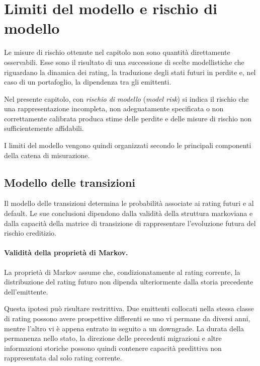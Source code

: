 \section{Limiti del modello e rischio di modello}

\label{sec:cap9-limiti-rischio-modello}

Le misure di rischio ottenute nel capitolo non sono quantit\`{a}
direttamente osservabili. Esse sono il risultato di una successione di
scelte modellistiche che riguardano la dinamica dei rating, la
traduzione degli stati futuri in perdite e, nel caso di un portafoglio,
la dipendenza tra gli emittenti.

Nel presente capitolo, con \emph{rischio di modello}
(\emph{model risk}) si indica il rischio che una rappresentazione
incompleta, non adeguatamente specificata o non correttamente calibrata
produca stime delle perdite e delle misure di rischio non sufficientemente
affidabili.

I limiti del modello vengono quindi organizzati secondo le principali
componenti della catena di misurazione.

\subsection{Modello delle transizioni}

\label{subsec:cap9-limiti-transizioni}

Il modello delle transizioni determina le probabilit\`{a} associate ai
rating futuri e al default. Le sue conclusioni dipendono dalla validit\`{a}
della struttura markoviana e dalla capacit\`{a} della matrice di
transizione di rappresentare l'evoluzione futura del rischio creditizio.

\paragraph{Validit\`{a} della propriet\`{a} di Markov.}

La propriet\`{a} di Markov assume che, condizionatamente al rating
corrente, la distribuzione del rating futuro non dipenda ulteriormente
dalla storia precedente dell'emittente.

Questa ipotesi pu\`{o} risultare restrittiva. Due emittenti collocati
nella stessa classe di rating possono avere prospettive differenti se
uno vi permane da diversi anni, mentre l'altro vi \`{e} appena entrato
in seguito a un downgrade. La durata della permanenza nello stato, la
direzione delle precedenti migrazioni e altre informazioni storiche
possono quindi contenere capacit\`{a} predittiva non rappresentata dal
solo rating corrente.

